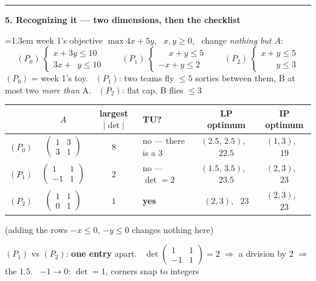 \documentclass[10pt]{article}
\newcommand{\beat}[2]{%
  \par\medskip\needspace{8\baselineskip}%
  {\color{ruleink}\rule{\textwidth}{1pt}}\par\nobreak\vspace{2pt}
  {\large\bfseries #1.\; #2}\par\nobreak\vspace{3pt}}
\newenvironment{board}{%
  \par\vspace{2pt}
  \begingroup\leftskip=1.3em\relax}{%
  \par\endgroup\vspace{2pt}}
\begin{document}
\beat{5}{Recognizing it --- two dimensions, then the checklist}
\begin{board}
week 1's objective $\max 4x + 5y$, \ $x,y \ge 0$, \ change \emph{nothing but} $A$:
\[
  (P_0) \ \begin{cases} x + 3y \le 10 \\ 3x + \phantom{3}y \le 10 \end{cases}
  \qquad
  (P_1) \ \begin{cases} \phantom{-}x + y \le 5 \\ -x + y \le 2 \end{cases}
  \qquad
  (P_2) \ \begin{cases} x + y \le 5 \\ \phantom{x + {}} y \le 3 \end{cases}
\]
$(P_0)$ = week 1's toy. \ $(P_1)$: two teams fly $\le 5$ sorties between them, B at most two \emph{more than} A.
\ $(P_2)$: flat cap, B flies $\le 3$
\vspace{3pt}

\begin{center}
\begin{tabular}{@{}l|c|c|l|c|c@{}}
 & $A$ & largest $|\det|$ & TU? & LP optimum & IP optimum \\ \hline
 $(P_0)$ & $\left(\begin{smallmatrix} 1 & 3 \\ 3 & 1 \end{smallmatrix}\right)$ &
   $8$ & no --- there is a 3 & $(2.5,\, 2.5)$, \ $22.5$ & $(1,3)$, \ $19$ \\[4pt]
 $(P_1)$ & $\left(\begin{smallmatrix} 1 & 1 \\ -1 & 1 \end{smallmatrix}\right)$ &
   $2$ & no --- $\det = 2$ & $(1.5,\, 3.5)$, \ $23.5$ & $(2,3)$, \ $23$ \\[4pt]
 $(P_2)$ & $\left(\begin{smallmatrix} 1 & 1 \\ 0 & 1 \end{smallmatrix}\right)$ &
   $1$ & \textbf{yes} & $(2,3)$, \ $23$ & $(2,3)$, \ $23$ \\
\end{tabular}
\end{center}
\vspace{2pt}

(adding the rows $-x \le 0$, $-y \le 0$ changes nothing here)
\vspace{2pt}

$(P_1)$ vs $(P_2)$: \textbf{one entry} apart. \
$\det \left(\begin{smallmatrix} 1 & 1 \\ -1 & 1\end{smallmatrix}\right) = 2$ $\Rightarrow$ a division by 2 $\Rightarrow$ the $1.5$.
\ $-1 \to 0$: $\det = 1$, corners snap to integers
\end{board}
\end{document}
